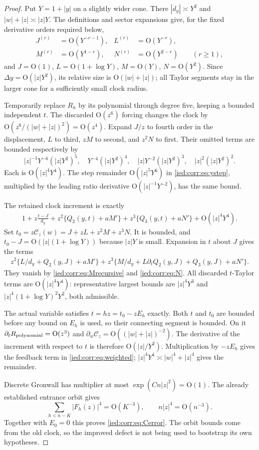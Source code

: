 \documentclass[11pt,letterpaper]{article}
\theoremstyle{remark}\newtheorem{remark}[theorem]{Remark}
\newcommand{\Oh}{\mathrm O}\newcommand{\supp}{\operatorname{supp}}
\begin{document}
\begin{proof}
Put $Y=1+|y|$ on a slightly wider cone. There $|d_y|\asymp Y^2$ and $|w|+|z|\asymp|z|Y$. The definitions and sector expansions give, for the fixed derivative orders required below,
\begin{align*}
 J^{(r)}&=\Oh(Y^{-r-1}),& L^{(r)}&=\Oh(Y^{-r}),\\
 M^{(r)}&=\Oh(Y^{1-r}),& N^{(r)}&=\Oh(Y^{2-r})\qquad(r\ge1),
\end{align*}
and $J=\Oh(1)$, $L=\Oh(1+\log Y)$, $M=\Oh(Y)$, $N=\Oh(Y^2)$. Since $\Delta y=\Oh(|z|Y^2)$, its relative size is $\Oh(|w|+|z|)$; all Taylor segments stay in the larger cone for a sufficiently small clock radius.

Temporarily replace $R_h$ by its polynomial through degree five, keeping a bounded independent $t$. The discarded $\Oh(z^6)$ forcing changes the clock by $\Oh(z^6/(|w|+|z|)^2)=\Oh(z^4)$. Expand $J/z$ to fourth order in the displacement, $L$ to third, $zM$ to second, and $z^2N$ to first. Their omitted terms are bounded respectively by
\[
 |z|^{-1}Y^{-6}(|z|Y^2)^5,\quad
 Y^{-4}(|z|Y^2)^4,\quad
 |z|Y^{-2}(|z|Y^2)^3,\quad
 |z|^2(|z|Y^2)^2.
\]
Each is $\Oh(|z|^4Y^4)$. The step remainder $\Oh(|z|^5Y^6)$ in \eqref{ied:corr:eq:ystep}, multiplied by the leading ratio derivative $\Oh(|z|^{-1}Y^{-2})$, has the same bound.

The retained clock increment is exactly
\begin{align*}
 1+z\frac{t-J}{d_y}
 +z^2\{Q_2(y,t)+aM'\}
 +z^3\{Q_3(y,t)+aN'\}+\Oh(|z|^4Y^4).
\end{align*}
Set $t_0=z\mathcal C_z(w)=J+zL+z^2M+z^3N$. It is bounded, and
$t_0-J=\Oh(|z|(1+\log Y))$ because $|z|Y$ is small. Expansion in $t$ about $J$ gives the terms
\begin{align*}
 z^2\{L/d_y+Q_2(y,J)+aM'\}
 +z^3\{M/d_y+L\partial_tQ_2(y,J)+Q_3(y,J)+aN'\}.
\end{align*}
They vanish by \eqref{ied:corr:eq:Mrecursive} and \eqref{ied:corr:eq:N}. All discarded $t$-Taylor terms are $\Oh(|z|^4Y^4)$: representative largest bounds are $|z|^4Y^3$ and $|z|^4(1+\log Y)^2Y^2$, both admissible.

The actual variable satisfies $t=hz=t_0-zE_h$ exactly. Both $t$ and $t_0$ are bounded before any bound on $E_h$ is used, so their connecting segment is bounded. On it $\partial_tR_{\rm polynomial}=\Oh(z^3)$ and $\partial_w\mathcal C_z=\Oh((|w|+|z|)^{-2})$. The derivative of the increment with respect to $t$ is therefore $\Oh(|z|/Y^2)$. Multiplication by $-zE_h$ gives the feedback term in \eqref{ied:corr:eq:weighted}; $|z|^4Y^4\asymp|w|^4+|z|^4$ gives the remainder.

Discrete Gronwall has multiplier at most $\exp(Cn|z|^2)=\Oh(1)$. The already established entrance orbit gives
\[
 \sum_{h<n-K}|F_h(z)|^4=\Oh(K^{-3}),\qquad n|z|^4=\Oh(n^{-3}).
\]
Together with $E_0=0$ this proves \eqref{ied:corr:eq:Cerror}. The orbit bounds come from the old clock, so the improved defect is not being used to bootstrap its own hypotheses.
\end{proof}
\end{document}
